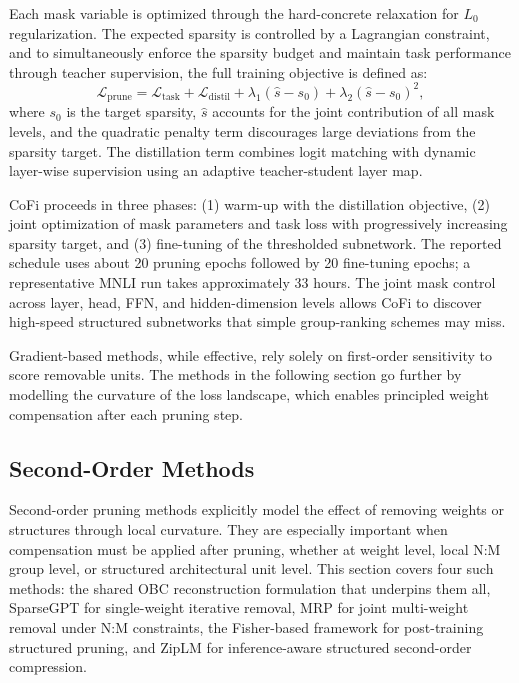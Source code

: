 Each mask variable is optimized through the hard-concrete relaxation for $L_0$ regularization. The expected sparsity is controlled by a Lagrangian constraint, and to simultaneously enforce the sparsity budget and maintain task performance through teacher supervision, the full training objective is defined as:
\begin{equation}
	\mathcal{L}_{\mathrm{prune}}
	=
	\mathcal{L}_{\mathrm{task}}
	+
	\mathcal{L}_{\mathrm{distil}}
	+
	\lambda_1(\hat s - s_0)
	+
	\lambda_2(\hat s - s_0)^2,
\end{equation}
where $s_0$ is the target sparsity, $\hat{s}$ accounts for the joint contribution of all mask levels, and the quadratic penalty term discourages large deviations from the sparsity target. The distillation term combines logit matching with dynamic layer-wise supervision using an adaptive teacher-student layer map.

CoFi proceeds in three phases: (1) warm-up with the distillation objective, (2) joint optimization of mask parameters and task loss with progressively increasing sparsity target, and (3) fine-tuning of the thresholded subnetwork. The reported schedule uses about 20 pruning epochs followed by 20 fine-tuning epochs; a representative MNLI run takes approximately 33 hours. The joint mask control across layer, head, FFN, and hidden-dimension levels allows CoFi to discover high-speed structured subnetworks that simple group-ranking schemes may miss.

Gradient-based methods, while effective, rely solely on first-order sensitivity to score removable units. The methods in the following section go further by modelling the curvature of the loss landscape, which enables principled weight compensation after each pruning step.

\subsection{Second-Order Methods}

Second-order pruning methods explicitly model the effect of removing weights or structures through local curvature. They are especially important when compensation must be applied after pruning, whether at weight level, local N:M group level, or structured architectural unit level. This section covers four such methods: the shared OBC reconstruction formulation that underpins them all, SparseGPT for single-weight iterative removal, MRP for joint multi-weight removal under N:M constraints, the Fisher-based framework for post-training structured pruning, and ZipLM for inference-aware structured second-order compression.

